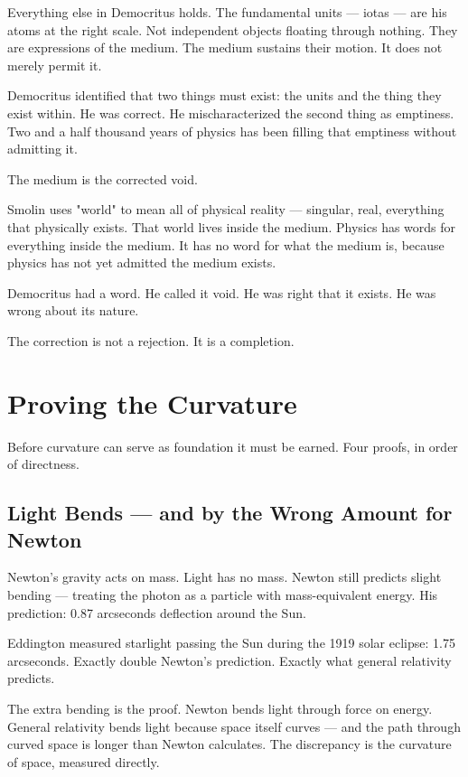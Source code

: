 \documentclass[11pt]{article}
\begin{document}
Everything else in Democritus holds. The fundamental units — iotas — are his
atoms at the right scale. Not independent objects floating through nothing. They
are expressions of the medium. The medium sustains their motion. It does not
merely permit it.

Democritus identified that two things must exist: the units and the thing they
exist within. He was correct. He mischaracterized the second thing as emptiness.
Two and a half thousand years of physics has been filling that emptiness without
admitting it.

The medium is the corrected void.

Smolin uses "world" to mean all of physical reality — singular, real, everything
that physically exists. That world lives inside the medium. Physics has words for
everything inside the medium. It has no word for what the medium is, because
physics has not yet admitted the medium exists.

Democritus had a word. He called it void. He was right that it exists. He was
wrong about its nature.

The correction is not a rejection. It is a completion.

\section{Proving the Curvature}
\label{sec:org2b810cf}

Before curvature can serve as foundation it must be earned. Four proofs, in
order of directness.

\subsection{Light Bends — and by the Wrong Amount for Newton}
\label{sec:org5be3ac8}

Newton's gravity acts on mass. Light has no mass. Newton still predicts slight
bending — treating the photon as a particle with mass-equivalent energy. His
prediction: 0.87 arcseconds deflection around the Sun.

Eddington measured starlight passing the Sun during the 1919 solar eclipse:
1.75 arcseconds. Exactly double Newton's prediction. Exactly what general
relativity predicts.

The extra bending is the proof. Newton bends light through force on energy.
General relativity bends light because space itself curves — and the path through
curved space is longer than Newton calculates. The discrepancy is the curvature
of space, measured directly.
\end{document}
